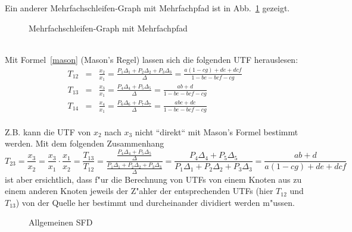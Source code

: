 \clearpage
\bsp{}
\nit Ein anderer Mehrfachschleifen-Graph mit Mehrfachpfad ist in
Abb.~\ref{SFD24} gezeigt. ~\\
\begin{figure}[htb!]
\vspace*{-5mm}\begin{center}
  \caption{Mehrfachschleifen-Graph mit Mehrfachpfad}\label{SFD24}
\end{center}\vspace*{-7mm}
\end{figure}~\\
\nit Mit Formel~\ref{mason} (Mason's Regel) lassen sich die folgenden
UTF herauslesen:
\begin{eqnarray*}
  T_{12} & = & \frac{x_2}{x_1} = \frac{P_1\Delta_1 + P_2\Delta_2 + P_3\Delta_3}{\Delta} = \frac{a(1-cg)+de+dcf}{1-be-bcf-cg}\\
   T_{13} & = & \frac{x_3}{x_1} = \frac{P_4\Delta_4 + P_5\Delta_5}{\Delta} = \frac{ab+d}{1-be-bcf-cg}\\
  T_{14} & = & \frac{x_4}{x_1} = \frac{P_6\Delta_6 + P_7\Delta_7}{\Delta} = \frac{abc+dc}{1-be-bcf-cg}
\end{eqnarray*}
\\
 Z.B. kann die UTF von $x_2$ nach $x_3$ nicht ``direkt`` mit Mason's Formel bestimmt werden. Mit dem folgenden Zusammenhang
\begin{equation*}
 T_{23}=\frac{x_3}{x_2}=\frac{x_3}{x_1}\cdot\frac{x_1}{x_2}=\frac{T_{13}}{T_{12}}=\frac{\frac{P_4\Delta_4 + P_5\Delta_5}{\Delta} }{\frac{P_1\Delta_1 + P_2\Delta_2 + P_3\Delta_3}{\Delta} }=\frac{P_4\Delta_4 + P_5\Delta_5}{P_1\Delta_1 + P_2\Delta_2 + P_3\Delta_3}=\frac{ab+d}{a(1-cg)+de+dcf}
\end{equation*}
ist aber ersichtlich, dass f"ur die Berechnung von UTFs von einem Knoten aus zu einem anderen Knoten jeweils der Z"ahler der entsprechenden UTFs (hier $T_{12}$ und $T_{13}$) von der Quelle her bestimmt und durcheinander dividiert werden m"ussen.

\clearpage
{}
\begin{figure}[htb!]\vspace*{-7mm}
\begin{center} 
  \caption{Allgemeinen SFD}\label{SFD_alles}
\end{center}
\vspace*{-9mm}
\end{figure}

